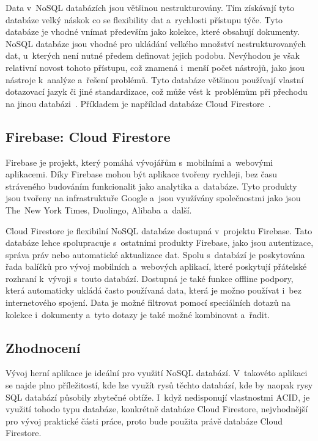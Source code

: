 Data v~NoSQL databázích jsou většinou nestrukturovány.
Tím získávají tyto databáze velký náskok co se flexibility dat a~rychlosti
přístupu týče.
Tyto databáze je vhodné vnímat především jako kolekce,
které obsahují dokumenty. 
NoSQL databáze jsou vhodné pro ukládání velkého množství nestrukturovaných dat,
u~kterých není nutné předem definovat jejich podobu.
Nevýhodou je však relativní novost tohoto přístupu,
což znamená i~menší počet nástrojů,
jako jsou nástroje k~analýze a~řešení problémů.
Tyto databáze většinou používají vlastní dotazovací jazyk či jiné standardizace,
což může vést k~problémům při přechodu na jinou databázi~\cite{sql_nosql}.
Příkladem je například databáze Cloud Firestore~\cite{cloud_firestore}.

\subsection{Firebase: Cloud Firestore}

Firebase je projekt,
který pomáhá vývojářům s~mobilními a~webovými aplikacemi.
Díky Firebase mohou být aplikace tvořeny rychleji,
bez času stráveného budováním funkcionalit jako analytika a~databáze.
Tyto produkty jsou tvořeny na infrastruktuře Google
a~jsou využívány společnostmi jako jsou The~New York Times,
Duolingo, Alibaba a~další.~\cite{firebase}

Cloud Firestore je flexibilní NoSQL databáze dostupná v~projektu \mbox{Firebase}.
Tato databáze lehce spolupracuje s~ostatními produkty Firebase,
jako jsou autentizace, správa práv nebo automatické aktualizace dat.
Spolu s~databází je poskytována řada balíčků pro vývoj mobilních a~webových
aplikací,
které poskytují přátelské rozhraní k~vývoji s~touto databází.
Dostupná je také funkce offline podpory,
která automaticky ukládá často používaná data,
která je možno používat i~bez internetového spojení.
Data je možné filtrovat pomocí speciálních dotazů na kolekce i~dokumenty
a~tyto dotazy je také možné kombinovat a~řadit.~\cite{cloud_firestore}

\pagebreak
\subsection{Zhodnocení}

Vývoj herní aplikace je ideální pro využití NoSQL databází.
V~takovéto aplikaci se najde plno příležitostí,
kde lze využít rysů těchto databází,
kde by naopak rysy SQL databází působily zbytečné obtíže.
I~když nedisponují vlastnostmi ACID,
je využití tohodo typu databáze,
konkrétně databáze Cloud Firestore,
nejvhodnější pro vývoj praktické části práce,
proto bude použita právě databáze Cloud Firestore.
